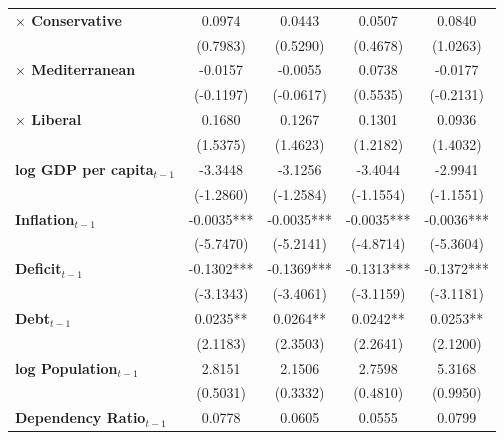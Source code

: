 \begin{center}
\begin{tabular}{lcccc}
\textbf{$\times$ Conservative}         &     0.0974     &      0.0443      &      0.0507      &      0.0840       \\
\textbf{ }                         &    (0.7983)    &     (0.5290)     &     (0.4678)     &     (1.0263)      \\
\textbf{$\times$ Mediterranean}        &    -0.0157     &     -0.0055      &      0.0738      &     -0.0177       \\
\textbf{ }                         &   (-0.1197)    &    (-0.0617)     &     (0.5535)     &    (-0.2131)      \\
\textbf{$\times$ Liberal}              &     0.1680     &      0.1267      &      0.1301      &      0.0936       \\
\textbf{ }                         &    (1.5375)    &     (1.4623)     &     (1.2182)     &     (1.4032)      \\
\textbf{log GDP per capita$_{t-1}$}           &    -3.3448     &     -3.1256      &     -3.4044      &     -2.9941       \\
\textbf{ }                         &   (-1.2860)    &    (-1.2584)     &    (-1.1554)     &    (-1.1551)      \\
\textbf{Inflation$_{t-1}$}      &   -0.0035***   &    -0.0035***    &    -0.0035***    &    -0.0036***     \\
\textbf{ }                         &   (-5.7470)    &    (-5.2141)     &    (-4.8714)     &    (-5.3604)      \\
\textbf{Deficit$_{t-1}$}             &   -0.1302***   &    -0.1369***    &    -0.1313***    &    -0.1372***     \\
\textbf{ }                         &   (-3.1343)    &    (-3.4061)     &    (-3.1159)     &    (-3.1181)      \\
\textbf{Debt$_{t-1}$}                &    0.0235**    &     0.0264**     &     0.0242**     &     0.0253**      \\
\textbf{ }                         &    (2.1183)    &     (2.3503)     &     (2.2641)     &     (2.1200)      \\
\textbf{log Population$_{t-1}$}      &     2.8151     &      2.1506      &      2.7598      &      5.3168       \\
\textbf{ }                         &    (0.5031)    &     (0.3332)     &     (0.4810)     &     (0.9950)      \\
\textbf{Dependency Ratio$_{t-1}$}   &     0.0778     &      0.0605      &      0.0555      &      0.0799       \\

\end{tabular}
\end{center}
